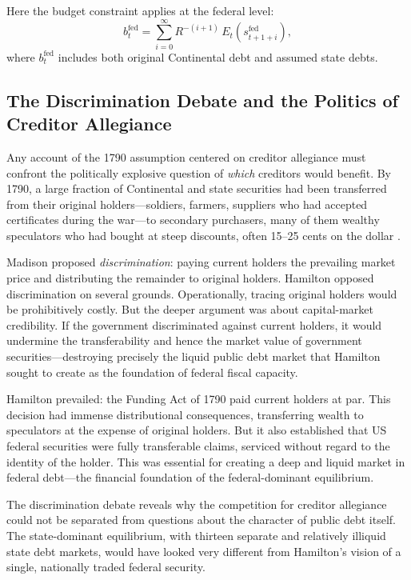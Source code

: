 \documentclass[12pt]{article}
\begin{document}
Here the budget constraint applies at the federal level:
\begin{equation}
\label{eq:federal}
b_t^{\text{fed}} = \sum_{i=0}^{\infty} R^{-(i+1)}\,
E_t(s_{t+1+i}^{\text{fed}}),
\end{equation}
where $b_t^{\text{fed}}$ includes both original Continental debt and
assumed state debts.

\subsection{The Discrimination Debate and the Politics of Creditor
Allegiance}
\label{sec:discrimination}

Any account of the 1790 assumption centered on creditor allegiance must
confront the politically explosive question of \emph{which} creditors
would benefit. By 1790, a large fraction of Continental and state
securities had been transferred from their original holders---soldiers,
farmers, suppliers who had accepted certificates during the war---to
secondary purchasers, many of them wealthy speculators who had bought at
steep discounts, often 15--25 cents on the dollar
\citep[pp.~271--275]{Ferguson1961}.

Madison proposed \emph{discrimination}: paying current holders the
prevailing market price and distributing the remainder to original
holders. Hamilton opposed discrimination on several grounds.
Operationally, tracing original holders would be prohibitively costly.
But the deeper argument was about capital-market credibility. If the
government discriminated against current holders, it would undermine the
transferability and hence the market value of government
securities---destroying precisely the liquid public debt market that
Hamilton sought to create as the foundation of federal fiscal capacity.

Hamilton prevailed: the Funding Act of 1790 paid current holders at par.
This decision had immense distributional consequences, transferring
wealth to speculators at the expense of original holders. But it also
established that US federal securities were fully transferable claims,
serviced without regard to the identity of the holder. This was
essential for creating a deep and liquid market in federal debt---the
financial foundation of the federal-dominant equilibrium.

The discrimination debate reveals why the competition for creditor
allegiance could not be separated from questions about the character of
public debt itself. The state-dominant equilibrium, with thirteen
separate and relatively illiquid state debt markets, would have looked
very different from Hamilton's vision of a single, nationally traded
federal security.
\end{document}
